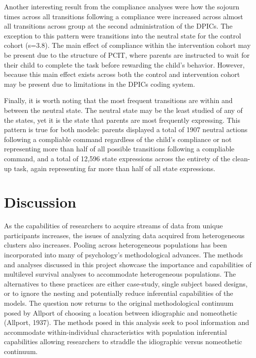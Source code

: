 \documentclass[12pt]{./styles/outhesis}
\begin{document}
Another interesting result from the compliance analyses were how the
sojourn times across all transitions following a compliance were
increased across almost all transitions across group at the second
administration of the DPICs. The exception to this pattern were
transitions into the neutral state for the control cohort (s=3.8). The
main effect of compliance within the intervention cohort may be present
due to the structure of PCIT, where parents are instructed to wait for
their child to complete the task before rewarding the child's behavior.
However, because this main effect exists across both the control and
intervention cohort may be present due to limitations in the DPICs
coding system.

Finally, it is worth noting that the most frequent transitions are
within and between the neutral state. The neutral state may be the least
studied of any of the states, yet it is the state that parents are most
frequently expressing. This pattern is true for both models: parents
displayed a total of 1907 neutral actions following a compliable command
regardless of the child's compliance or not representing more than
half of all possible transitions following a compliable command, and a
total of 12,596 state expressions across the entirety of the clean-up
task, again representing far more than half of all state expressions.

\chapter{Discussion}

As the capabilities of researchers to acquire streams of data from
unique participants increases, the issues of analyzing data acquired
from heterogeneous clusters also increases. Pooling across heterogeneous
populations has been incorporated into many of psychology's
methodological advances. The methods and analyses discussed in this
project showcase the importance and capabilities of multilevel survival
analyses to accommodate heterogeneous populations. The alternatives to
these practices are either case-study, single subject based designs, or
to ignore the nesting and potentially reduce inferential capabilities of
the models. The question now returns to the original methodological
continuum posed by Allport of choosing a location between idiographic and
nomeothetic (Allport, 1937). The methods posed in this analysis seek to
pool information and accommodate within-individual characteristics with population inferential capabilities allowing researchers to straddle the idiographic versus nomeothetic continuum.
\end{document}
